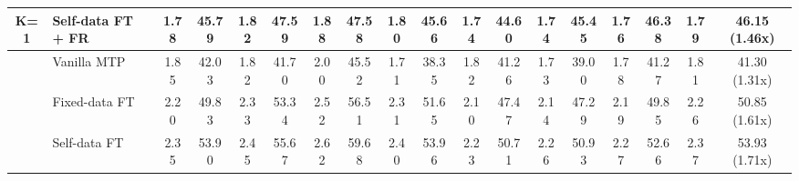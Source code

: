 \documentclass{article} %
\begin{document}
\begin{table}[ht]
\begin{adjustbox}{width=\textwidth}
\begin{tabular}{clcccccccccccccccc}
\multirow{-4}{*}{K=1}             & Self-data FT + FR                         & 1.78                         & 45.79                                  & 1.82                         & 47.59                                  & 1.88                         & 47.58                                  & 1.80                         & 45.66                                  & 1.74                         & 44.60                                  & 1.74                         & 45.45                                  & 1.76                         & 46.38                                  & 1.79                         & 46.15 (1.46x)                                  \\ \midrule
                                  & Vanilla MTP                                   & 1.85                         & 42.03                                  & 1.82                         & 41.70                                  & 2.00                         & 45.52                                  & 1.71                         & 38.35                                  & 1.82                         & 41.26                                  & 1.73                         & 39.00                                  & 1.78                         & 41.27                                  & 1.81                         & 41.30 (1.31x)                                  \\
                                  & Fixed-data FT                             & 2.20                         & 49.83                                  & 2.33                         & 53.34                                  & 2.52                         & 56.51                                  & 2.31                         & 51.65                                  & 2.10                         & 47.47                                  & 2.14                         & 47.29                                  & 2.19                         & 49.85                                  & 2.26                         & 50.85 (1.61x)                                  \\
                                  & Self-data FT                              & 2.35                         & 53.90                                  & 2.45                         & 55.67                                  & 2.62                         & 59.68                                  & 2.40                         & 53.96                                  & 2.23                         & 50.71                                  & 2.26                         & 50.93                                  & 2.27                         & 52.66                                  & 2.37                         & 53.93 (1.71x)                                  \\

\end{tabular}
\end{adjustbox}
\end{table}
\end{document}
